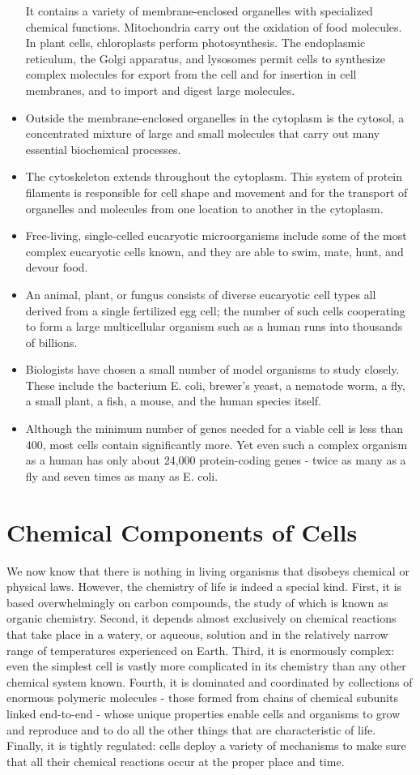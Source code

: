 \begin{itemize}
It contains a variety of membrane-enclosed organelles with specialized chemical functions. Mitochondria carry out the oxidation of food
molecules. In plant cells, chloroplasts perform photosynthesis. The
endoplasmic reticulum, the Golgi apparatus, and lysosomes permit cells to synthesize complex molecules for export from the cell
and for insertion in cell membranes, and to import and digest large
molecules.
\item Outside the membrane-enclosed organelles in the cytoplasm is the
cytosol, a concentrated mixture of large and small molecules that
carry out many essential biochemical processes.
\item The cytoskeleton extends throughout the cytoplasm. This system of
protein filaments is responsible for cell shape and movement and
for the transport of organelles and molecules from one location to
another in the cytoplasm.
\item Free-living, single-celled eucaryotic microorganisms include some of
the most complex eucaryotic cells known, and they are able to swim,
mate, hunt, and devour food.
\item An animal, plant, or fungus consists of diverse eucaryotic cell types
all derived from a single fertilized egg cell; the number of such cells
cooperating to form a large multicellular organism such as a human
runs into thousands of billions.
\item Biologists have chosen a small number of model organisms to study
closely. These include the bacterium E. coli, brewer’s yeast, a nematode worm, a fly, a small plant, a fish, a mouse, and the human
species itself.
\item Although the minimum number of genes needed for a viable cell is
less than 400, most cells contain significantly more. Yet even such a
complex organism as a human has only about 24,000 protein-coding
genes - twice as many as a fly and seven times as many as E. coli.
\end{itemize}

\chapter{Chemical Components of Cells}

We now know that there is nothing in living organisms that disobeys
chemical or physical laws. However, the chemistry of life is indeed a
special kind. First, it is based overwhelmingly on carbon compounds,
the study of which is known as organic chemistry. Second, it depends
almost exclusively on chemical reactions that take place in a watery,
or aqueous, solution and in the relatively narrow range of temperatures
experienced on Earth. Third, it is enormously complex: even the simplest
cell is vastly more complicated in its chemistry than any other chemical
system known. Fourth, it is dominated and coordinated by collections of
enormous polymeric molecules - those formed from chains of chemical
subunits linked end-to-end - whose unique properties enable cells and
organisms to grow and reproduce and to do all the other things that are
characteristic of life. Finally, it is tightly regulated: cells deploy a variety
of mechanisms to make sure that all their chemical reactions occur at the
proper place and time.

